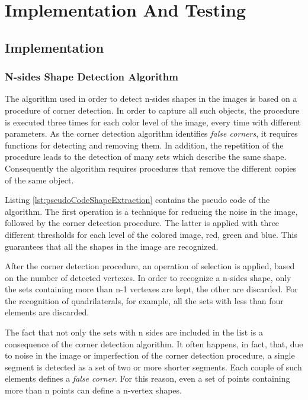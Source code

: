 \chapter{Implementation And Testing}\label{impl_test}
	
	\section{Implementation}
	
		\subsection{N-sides Shape Detection Algorithm}
		The algorithm used in order to detect n-sides shapes in the images is based on a procedure of corner detection. 
		In order to capture all such objects, the procedure is executed three times for each color level of the image, every time with different parameters.
		As the corner detection algorithm identifies \emph{false corners}, it requires functions for detecting and removing them. 
		In addition, the repetition of the procedure leads to the detection of many sets which describe the same shape.	
		Consequently the algorithm requires procedures that remove the different copies of the same object.


		
		Listing \ref{lst:pseudoCodeShapeExtraction} contains the pseudo code of the algorithm.
		The first operation is a technique for reducing the noise in the image, followed by the corner detection procedure.
		The latter is applied with three different thresholds for each level of the colored image, red, green and blue.
		This guarantees that all the shapes in the image are recognized.
		
		After the corner detection procedure, an operation of selection is applied, based on the number of detected vertexes.
		In order to recognize a n-sides shape, only the sets containing more than n-1 vertexes are kept, the other are discarded.
		For the recognition of quadrilaterals, for example, all the sets with less than four elements are discarded.
		


		The fact that not only the sets with n sides are included in the list is a consequence of the corner detection algorithm. 
		It often happens, in fact, that, due to noise in the image or imperfection of the corner detection procedure, a single segment is detected as a set of two or more shorter segments. 
		Each couple of such elements defines a \emph{false corner}. 
		For this reason, even a set of points containing more than n points can define a n-vertex shapes. 


